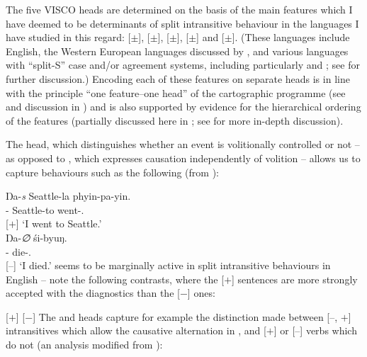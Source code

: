 \documentclass[output=paper]{langsci/langscibook}
\begin{document}
The five VISCO heads are determined on the basis of the main features which I\largerpage
have deemed to be determinants of split intransitive behaviour in the languages
I have studied in this regard: [$\pm$\Volition{}], [$\pm$\Initiation{}],
[$\pm$\State{}], [$\pm$\Change{}] and [$\pm$\Oriented{}]. (These languages include
English, the Western European languages discussed by \citet{Sorace2000}, and
various languages with \enquote{split-S} case and/or agreement systems,
including particularly  and ; see\linebreak
\citealt{Baker2016,Baker2018,Baker2019} for further discussion.) Encoding each
of these features on separate heads is in line with the principle \enquote{one
feature–one head} of the cartographic programme (see
\citealt{vanCraenenbroeck2009} and discussion in \citealt{Baker2018}) and is
also supported by evidence for the hierarchical ordering of the features
(partially discussed here in ; see \citealt{Baker2018} for more in-depth
discussion).

The \Volition{} head, which distinguishes whether an event is volitionally
controlled or not – as opposed to \Initiation{}, which expresses causation
independently of volition – allows us to capture behaviours such as the
following (from ):

\ea {} \parencite[132]{DeLancey1984}
    \ea
        \gll Ŋa-\textit{s} Seattle-la phyin-pa-yin.\\
        \Fsg-\Erg{}  Seattle-to  went-\Prf.\Vol\\ \hfill [$+$\Volition{}]
        \glt \enquote*{I went to Seattle.}\\
    \ex
        \gll Ŋa-\textit{∅} śi-byuŋ.\\
        \Fsg-\Abs{}    die-\Prf.\Invol\\ \hfill[$–$\Volition{}]
        \glt \enquote*{I died.}
    \z
\z
\Volition{} seems to be marginally active in split intransitive behaviours in
English -- note the following contrasts, where the [$+$\Volition{}] sentences are
more strongly accepted with the diagnostics than the [$-$\Volition{}] ones:

\ea
    \z
\z

\ea
    \ea {}[$+$\Volition{}]
        \z
    \ex {}[$-$\Volition{}]
        \z
    \z
\z
The \Initiation{} and \Change{} heads capture for example the distinction made
between [$–$\Initiation{}, $+$\Change{}] intransitives which allow the causative
alternation in , and [$+$\Initiation{}] or [$–$\Change{}] verbs which do not
(an analysis modified from \citealt{Ramchand2008}):\largerpage[-1]
\end{document}
